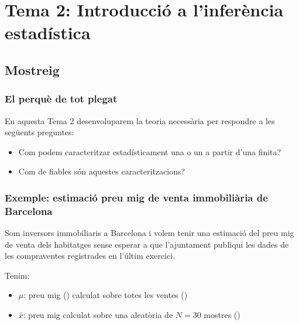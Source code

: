 \documentclass[letterpaper,10pt,english]{sphinxmanual}
\let\sphinxpxdimen\pdfpxdimen\else\newdimen\sphinxpxdimen
\begin{document}
\chapter{Tema 2: Introducció a l’inferència estadística}
\label{\detokenize{0_Intro/0_2_Intro_stats:tema-2-introduccio-a-l-inferencia-estadistica}}\label{\detokenize{0_Intro/0_2_Intro_stats::doc}}

\section{Mostreig}
\label{\detokenize{0_Intro/0_2_Intro_stats:mostreig}}

\subsection{El perquè de tot plegat}
\label{\detokenize{0_Intro/0_2_Intro_stats:el-perque-de-tot-plegat}}
En aquesta Tema 2 desenvoluparem la teoria necessària per respondre a les següents preguntes:
\begin{itemize}
\item {} 
Com podem caracteritzar estadísticament una  o un  a partir d’una  finita?

\item {} 
Com de fiables són aquestes caracteritzacions?

\end{itemize}

\begin{figure}[htbp]
\centering

\noindent\sphinxincludegraphics[height=400\sphinxpxdimen]{{mostreig}.png}
\end{figure}


\subsection{Exemple: estimació preu mig de venta immobiliària de Barcelona}
\label{\detokenize{0_Intro/0_2_Intro_stats:exemple-estimacio-preu-mig-de-venta-immobiliaria-de-barcelona}}
Som inversors immobiliaris a Barcelona i volem tenir una estimació del preu mig de
venta dels habitatges sense esperar a que l’ajuntament publiqui les dades de les
compra\sphinxhyphen{}ventes registrades en l’últim exercici.

Tenim:
\begin{itemize}
\item {} 
\(\mu\): preu mig () calculat sobre totes les ventes ()

\item {} 
\(\bar{x}\): preu mig calculat sobre una  aleatòria de \(N=30\) mostres ()

\end{itemize}
\end{document}
